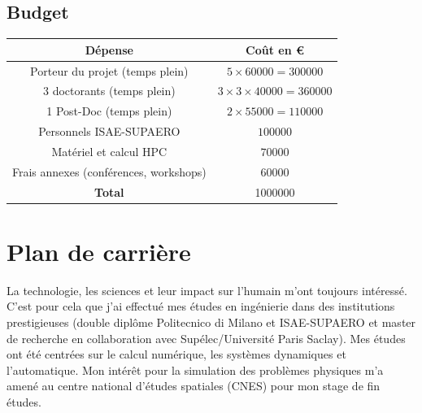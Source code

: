 \documentclass[12pt, french]{article}
\begin{document}
	
	\subsection{Budget}

	\begin{center}
		\begin{tabular}{|c|c|}
			\hline
			D\'epense & Co\^{u}t en \euro \\
			\hline
			Porteur du projet (temps plein) & $5\times 60000=300000$ \\
			3 doctorants (temps plein) & $3\times 3\times 40000=360000$  \\
			1 Post-Doc (temps plein) & $2\times 55000=110000$ \\
			Personnels ISAE-SUPAERO & $100000$ \\
			Matériel  et calcul HPC & $70000$ \\
			Frais annexes (conférences, workshops) & $60000$ \\
			\hline
			\textbf{Total} & 1000000 \\
			\hline
		\end{tabular}
	\end{center}
	
	
	
	
	
	
	\section{Plan de carrière}
	
	La technologie, les sciences et leur impact sur l'humain m'ont toujours intéressé. C'est pour cela que j'ai effectué mes études en ingénierie dans des institutions prestigieuses (double diplôme Politecnico di Milano et ISAE-SUPAERO et master de recherche en collaboration avec Supélec/Université Paris Saclay). Mes études ont été centrées sur le calcul numérique, les systèmes dynamiques et l'automatique. Mon intérêt pour la simulation des problèmes physiques m'a amené au centre national d'études spatiales (CNES) pour mon stage de fin études. \\
	
\end{document}

